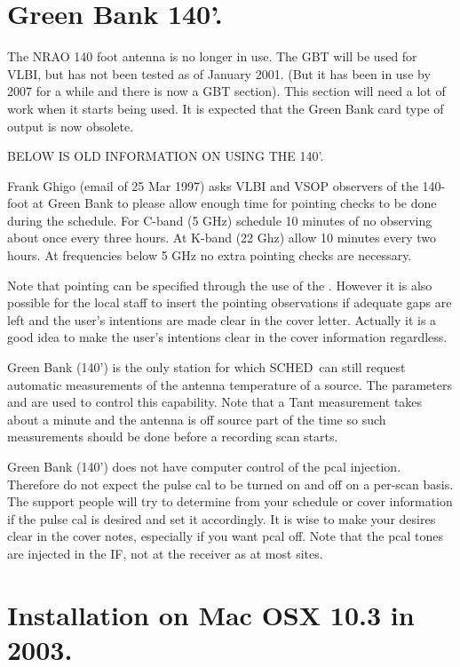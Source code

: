 \documentclass{report}
\newcommand{\schedb}{{\sc SCHED~}}
\begin{document}
\section{\label{SSEC:GB}Green Bank 140'.}

The NRAO 140 foot antenna is no longer in use.  The GBT will be used
for VLBI, but has not been tested as of January 2001. (But it has been
in use by 2007 for a while and there is now a GBT section).  This section
will need a lot of work when it starts being used.  It is expected
that the Green Bank card type of output is now obsolete.

BELOW IS OLD INFORMATION ON USING THE 140'.

Frank Ghigo (email of 25 Mar 1997) asks VLBI and VSOP observers of
the 140-foot at Green Bank to please allow enough time for pointing
checks to be done during the schedule.  For C-band (5 GHz) schedule 10
minutes of no observing about once every three hours.  At K-band (22
Ghz) allow 10 minutes every two hours.  At frequencies below 5 GHz no
extra pointing checks are necessary.

Note that pointing can be specified through the use of the
.  However it is also possible for the
local staff to insert the pointing observations if adequate gaps
are left and the user's intentions are made clear in the cover
letter.  Actually it is a good idea to make the user's intentions
clear in the cover information regardless.

Green Bank (140') is the only station for which \schedb can still
request automatic measurements of the antenna temperature of a
source.  The parameters  and
 are used to control this
capability.  Note that a Tant measurement takes about a minute
and the antenna is off source part of the time so such measurements
should be done before a recording scan starts.

Green Bank (140') does not have computer control of the pcal
injection.  Therefore do not expect the pulse cal to be turned on and
off on a per-scan basis.  The support people will try to determine
from your schedule or cover information if the pulse cal is desired
and set it accordingly.  It is wise to make your desires clear in the
cover notes, especially if you want pcal off.  Note that the pcal
tones are injected in the IF, not at the receiver as at most sites.


\section{\label{APP:Mac2003}Installation on Mac OSX 10.3 in 2003.}
\end{document}
